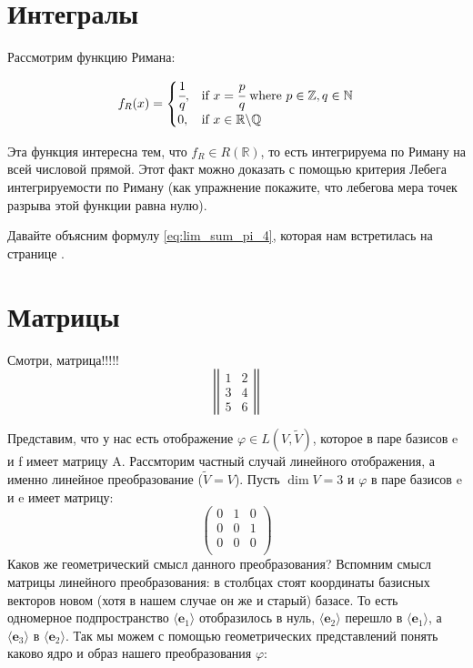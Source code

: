 \documentclass[a4paper,12pt]{article}
\begin{document}
\section{Интегралы}\label{integrals}

Рассмотрим функцию Римана:

\[
f_R(x) = \begin{cases}
	\cfrac{1}{q}, &\text{if } x = \cfrac{p}{q} \text{ where } p \in \mathbb{Z}, q \in \mathbb{N} \\
	0, &\text{if } x \in \mathbb{R} \backslash \mathbb{Q} 
\end{cases}
\]

Эта функция интересна тем, что $f_R \in R(\mathbb{R})$, то есть интегрируема по Риману на всей числовой прямой.
Этот факт можно доказать с помощью критерия Лебега интегрируемости по Риману (как упражнение покажите, что лебегова мера точек разрыва этой функции равна нулю).

Давайте объясним формулу \eqref{eq:lim_sum_pi_4}, которая нам встретилась на странице \pageref{eq:lim_sum_pi_4}.

\section{Матрицы}\label{Matrix} 

Смотри, матрица!!!!!
\[ 
\left|\left| 
\begin{array}{cc} 
1 & 2\\ 
3 & 4\\ 
5 & 6
\end{array} 
\right|\right| 
\]  

Представим, что у нас есть отображение $\varphi \in L(V, \tilde{V})$, которое в паре базисов e и f имеет матрицу A.
Рассмторим частный случай линейного отображения, а именно линейное преобразование ($\tilde{V} = V$). Пусть $\dim V = 3$ и $\varphi$ в паре базисов e и e имеет матрицу:
\[
	\begin{pmatrix}
		0 & 1 & 0 \\
		0 & 0 & 1 \\
		0 & 0 & 0 \\
	\end{pmatrix}
\]
Каков же геометрический смысл данного преобразования?
Вспомним смысл матрицы линейного преобразования: в столбцах стоят координаты базисных векторов новом (хотя в нашем случае он же и старый) базасе.
То есть одномерное подпространство $\langle\textbf{e}_1\rangle$ отобразилось в нуль, $\langle\textbf{e}_2\rangle$ перешло в $\langle\textbf{e}_1\rangle$, а $\langle\textbf{e}_3\rangle$ в $\langle\textbf{e}_2\rangle$.
Так мы можем с помощью геометрических представлений понять каково ядро и образ нашего преобразования $\varphi$:
\end{document}
